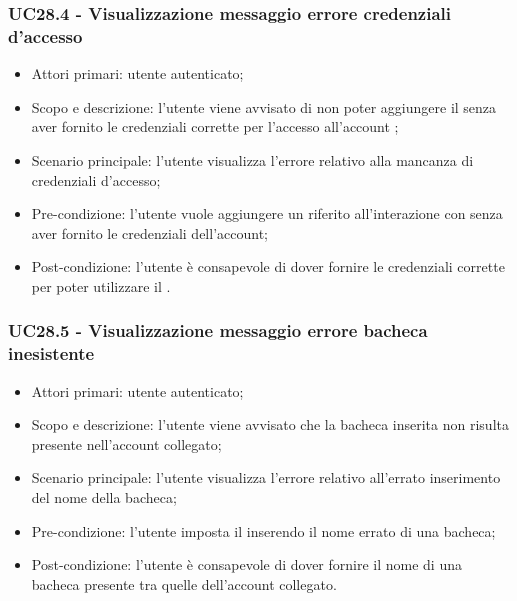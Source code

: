 \subsubsection{UC28.4 - Visualizzazione messaggio errore credenziali d'accesso}
\begin{itemize}
	\item  Attori primari: utente autenticato;
	\item  Scopo e descrizione: l'utente viene avvisato di non poter aggiungere il  senza aver fornito le credenziali corrette per l'accesso all'account ;
	\item  Scenario principale: l'utente visualizza l'errore relativo alla mancanza di credenziali d'accesso;
	\item  Pre-condizione: l'utente vuole aggiungere un  riferito all'interazione con  senza aver fornito le credenziali dell'account;
	\item  Post-condizione: l'utente è consapevole di dover fornire le credenziali corrette per poter utilizzare il .
\end{itemize}
\subsubsection{UC28.5 - Visualizzazione messaggio errore bacheca inesistente}
\begin{itemize}
	\item  Attori primari: utente autenticato;
	\item  Scopo e descrizione: l'utente viene avvisato che la bacheca inserita non risulta presente nell'account collegato;
	\item  Scenario principale: l'utente visualizza l'errore relativo all'errato inserimento del nome della bacheca;
	\item  Pre-condizione: l'utente imposta il  inserendo il nome errato di una bacheca;
	\item  Post-condizione: l'utente è consapevole di dover fornire il nome di una bacheca presente tra quelle dell'account collegato.
\end{itemize}
